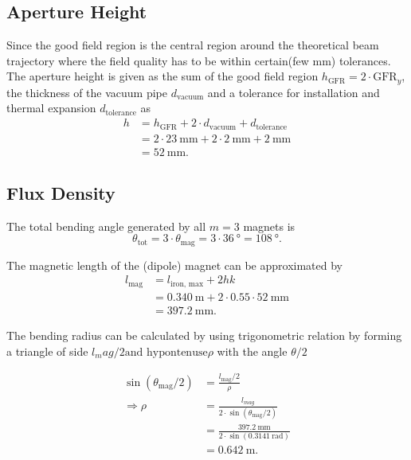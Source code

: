 \documentclass[10pt,a4paper,noendnumber=true]{scrartcl}
\begin{document}
\subsection{Aperture Height}
Since the good field region is the central region around the theoretical beam trajectory where the field quality has to be within certain(few mm) tolerances. \\

The aperture height is given as the sum of the good field region $h_\text{GFR} = 2\cdot \text{GFR}_y$, the thickness of the vacuum pipe $d_\text{vacuum}$ and a tolerance for installation and thermal expansion $d_\text{tolerance}$ as
\begin{align}
    h &= h_\text{GFR} + 2\cdot d_\text{vacuum} + d_\text{tolerance} \\
      &= 2\cdot\SI{23}{\mm} + 2\cdot \SI{2}{\mm} + \SI{2}{\mm}\nonumber\\ 
      &= \SI{52}{\mm}. \nonumber
\end{align}

\subsection{Flux Density}
The total bending angle generated by all $m=3$ magnets is
\begin{equation}
    \theta_\text{tot} = 3 \cdot \theta_\text{mag} = 3 \cdot \SI{36}{\degree} = \SI{108}{\degree}.
\end{equation}

The magnetic length of the (dipole) magnet can be approximated by
\begin{align}
    l_\text{mag} &= l_\text{iron, max} + 2hk \\
    &= \SI{0.340}{\meter} + 2\cdot 0.55 \cdot \SI{52}{\mm}\nonumber\\
    &= \SI{397.2}{\mm}.\nonumber
\end{align}

The bending radius can be calculated by using trigonometric relation by forming a triangle of side $l_mag/2 \text{and hypontenuse} \rho$ with the angle $\theta/2$

\begin{align}
    \sin(\theta_\text{mag}/2) &= \frac{l_\text{mag}/2}{\rho} \\
    \Rightarrow \rho  &= \frac{l_{mag}}{2\cdot\sin(\theta_\text{mag}/2)}\\
    &= \frac{\SI{397.2}{\mm}}{2\cdot \sin(\SI{0.3141}{\radian})} \\
    &= \SI{0.642}{\meter}. \nonumber
\end{align}
\end{document}
